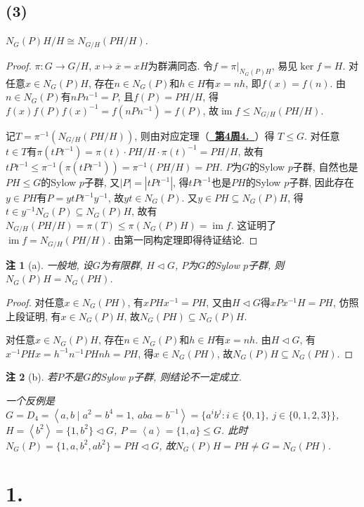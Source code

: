 \documentclass[12pt, a4paper, fontset=windows]{ctexart}
\newcommand{\abs}[1]{\left|{#1}\right|}
\newcommand{\cl}[1]{\overline{#1}} %
\newcommand{\gen}[1]{\left\langle{#1}\right\rangle}
\newcommand{\im}{\operatorname{im}}
\newcommand{\isom}{\cong} %
\newcommand{\kh}[1]{（{#1}）} %
\newcommand{\myref}[2][]{\hyperref[#1]{\bf\color{blue}\ {#2}\ }}
\newtheorem*{remark}{注}
\begin{document}
\subsection*{(3)}

$N_G(P)H/H\isom N_{G/H}(PH/H)$. 

\begin{proof}
$\pi:G\to G/H$, $x\mapsto\cl{x}=xH$为群满同态. 
令$f=\pi|_{N_G(P)H}$, 易见$\ker f=H$. 
对任意$x\in N_G(P)H$, 存在$n\in N_G(P)$和$h\in H$有$x=nh$, 即$f(x)=f(n)$. 
由$n\in N_G(P)$有$nPn^{-1}=P$, 且$f(P)=PH/H$, 得$f(x)f(P)f(x)^{-1}=f(nPn^{-1})=f(P)$, 
故$\im f\le N_{G/H}(PH/H)$. 

记$T=\pi^{-1}(N_{G/H}(PH/H))$, 则由对应定理\kh{\myref[group-correspond]{第4周4.}}得
$T\le G$. 对任意$t\in T$有$\pi(tPt^{-1})=\pi(t)\cdot PH/H\cdot\pi(t)^{-1}=PH/H$, 
故有$tPt^{-1}\le\pi^{-1}(\pi(tPt^{-1}))=\pi^{-1}(PH/H)=PH$. 
$P$为$G$的Sylow $p$子群, 自然也是$PH\le G$的Sylow $p$子群, 
又$\abs{P}=\abs{tPt^{-1}}$, 得$tPt^{-1}$也是$PH$的Sylow $p$子群, 
因此存在$y\in PH$有$P=ytPt^{-1}y^{-1}$, 故$yt\in N_G(P)$. 
又$y\in PH\subseteq N_G(P)H$, 得$t\in y^{-1}N_G(P)\subseteq N_G(P)H$, 
故有$N_{G/H}(PH/H)=\pi(T)\le\pi(N_G(P)H)=\im f$. 
这证明了$\im f=N_{G/H}(PH/H)$. 由第一同构定理即得待证结论. 
\end{proof}

\begin{remark}[a]
一般地, 设$G$为有限群, $H\lhd G$, $P$为$G$的Sylow $p$子群, 则$N_G(P)H=N_G(PH)$. 
\end{remark}

\begin{proof}
对任意$x\in N_G(PH)$, 有$xPHx^{-1}=PH$, 又由$H\lhd G$得$xPx^{-1}H=PH$, 
仿照上段证明, 有$x\in N_G(P)H$, 故$N_G(PH)\subseteq N_G(P)H$. 

对任意$x\in N_G(P)H$, 存在$n\in N_G(P)$和$h\in H$有$x=nh$. 
由$H\lhd G$, 有$x^{-1}PHx=h^{-1}n^{-1}PHnh=PH$, 得$x\in N_G(PH)$, 
故$N_G(P)H\subseteq N_G(PH)$. 
\end{proof}

\begin{remark}[b]
若$P$不是$G$的Sylow $p$子群, 则结论不一定成立. 

一个反例是$G=D_4=\gen{a,b\mid a^2=b^4=1,\ aba=b^{-1}}
=\{a^ib^j:i\in\{0,1\},\ j\in\{0,1,2,3\}\}$, 
$H=\gen{b^2}=\{1,b^2\}\lhd G$, $P=\gen{a}=\{1,a\}\le G$. 
此时$N_G(P)=\{1,a,b^2,ab^2\}=PH\lhd G$, 
故$N_G(P)H=PH\ne G=N_G(PH)$. 
\end{remark}

\section*{1.}
\end{document}
